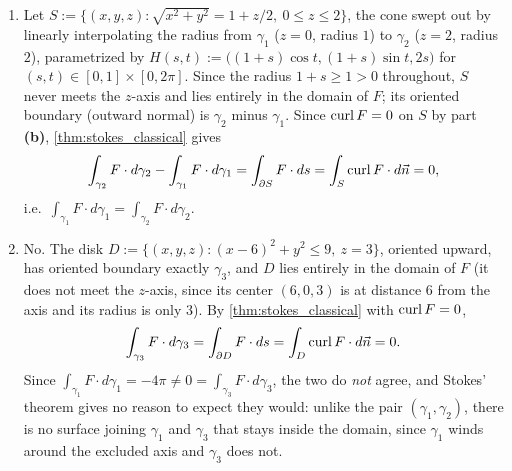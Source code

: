 \begin{exercisesolution}
\begin{enumerate}[label=\textbf{(\alph*)}]
  \item Let $S := \{(x,y,z) : \sqrt{x^2+y^2} = 1+z/2,\ 0\leq z\leq2\}$, the cone swept out
    by linearly interpolating the radius from $\gamma_1$ ($z=0$, radius $1$) to $\gamma_2$ ($z=2$,
    radius $2$), parametrized by $H(s,t) := \big((1+s)\cos t,(1+s)\sin t,2s\big)$ for $(s,t) \in
    [0,1]\times[0,2\pi]$. Since the radius $1+s \geq 1 > 0$ throughout, $S$ never meets the
    $z$-axis and lies entirely in the domain of $F$; its oriented boundary (outward normal) is
    $\gamma_2$ minus $\gamma_1$. Since $\operatorname{curl} F = 0$ on $S$ by part \textbf{(b)},
    \cref{thm:stokes_classical} gives
    \[\int_{\gamma_2} F\cdot d\gamma_2 - \int_{\gamma_1} F\cdot d\gamma_1 = \int_{\partial S}
      F\cdot ds = \int_S \operatorname{curl} F\cdot d\vec n = 0,\]
    i.e.\ $\int_{\gamma_1} F\cdot d\gamma_1 = \int_{\gamma_2} F\cdot d\gamma_2$.

  \item No. The disk $D := \{(x,y,z) : (x-6)^2+y^2 \leq 9,\ z=3\}$, oriented upward, has
    oriented boundary exactly $\gamma_3$, and $D$ lies entirely in the domain of $F$ (it does not
    meet the $z$-axis, since its center $(6,0,3)$ is at distance $6$ from the axis and its radius
    is only $3$). By \cref{thm:stokes_classical} with $\operatorname{curl} F=0$,
    \[\int_{\gamma_3} F\cdot d\gamma_3 = \int_{\partial D} F\cdot ds = \int_D \operatorname{curl} F\cdot d\vec n
      = 0.\]
    Since $\int_{\gamma_1} F\cdot d\gamma_1 = -4\pi \neq 0 = \int_{\gamma_3} F\cdot d\gamma_3$,
    the two do \emph{not} agree, and Stokes' theorem gives no reason to expect they would: unlike
    the pair $(\gamma_1,\gamma_2)$, there is no surface joining $\gamma_1$ and $\gamma_3$ that
    stays inside the domain, since $\gamma_1$ winds around the excluded axis and $\gamma_3$ does
    not.
\end{enumerate}
\end{exercisesolution}


